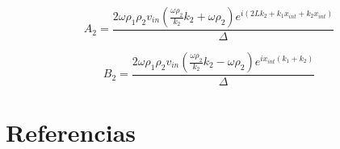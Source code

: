 \documentclass[11pt,letterpaper]{article}
\begin{document}
\begin{equation}
    A_2 = \frac{2 \omega \rho_{1} \rho_{2} v_{in} \left(\frac{\omega \rho_{2}}{k_{2}} k_{2} + \omega \rho_{2}\right) e^{i \left(2 L k_{2} + k_{1} x_{int} + k_{2} x_{int}\right)}}{\Delta}
\end{equation}

\begin{equation}
    B_2 = \frac{2 \omega \rho_{1} \rho_{2} v_{in} \left(\frac{\omega \rho_{2}}{k_{2}} k_{2} - \omega \rho_{2}\right) e^{i x_{int} \left(k_{1} + k_{2}\right)}}{\Delta}
\end{equation}

\section{Referencias}
\printbibliography[heading=none]
\end{document}
